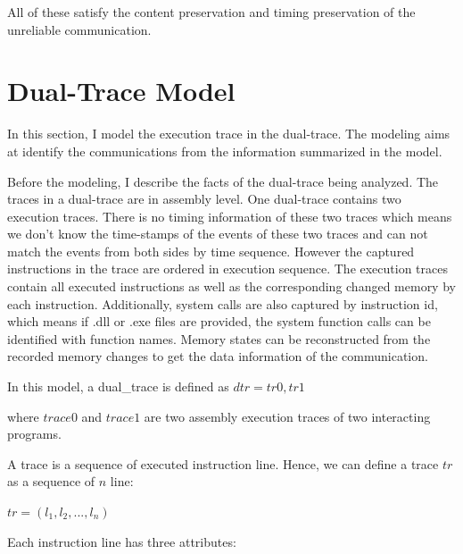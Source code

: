 All of these satisfy the content preservation and timing preservation of the unreliable communication.


\section{Dual-Trace Model}
In this section, I model the execution trace in the dual-trace. The modeling aims at identify the communications from the information summarized in the model. 

Before the modeling, I describe the facts of the dual-trace being analyzed. The traces in a dual-trace are in assembly level. One dual-trace contains two execution traces. There is no timing information of these two traces which means we don't know the time-stamps of the events of these two traces and can not match the events from both sides by time sequence. However the captured instructions in the trace are ordered in execution sequence. The execution traces contain all executed instructions as well as the corresponding changed memory by each instruction. Additionally, system calls are also captured by instruction id, which means if .dll or .exe files are provided, the system function calls can be identified with function names. Memory states can be reconstructed from the recorded memory changes to get the data information of the communication. 

In this model,  a dual\_trace is defined as $dtr = {tr0, tr1}$

where $trace0$ and $trace1$ are two assembly execution traces of two interacting programs.

A trace is a sequence of executed instruction line. Hence, we can define a trace $tr$ as a sequence of $n$ line:

$ tr = (l_1, l_2, ..., l_n)$ 

Each instruction line has three attributes:

